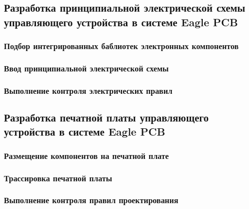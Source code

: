 \subsection{Разработка принципиальной электрической схемы управляющего устройства в системе Eagle PCB}
\subsubsection{Подбор интегрированных баблиотек электронных компонентов}
\subsubsection{Ввод принципиальной электрической схемы}
\subsubsection{Выполнение контроля электрических правил}

\subsection{Разработка печатной платы управляющего устройства в системе Eagle PCB}
\subsubsection{Размещение компонентов на печатной плате}
\subsubsection{Трассировка печатной платы}
\subsubsection{Выполнение контроля правил проектирования}
